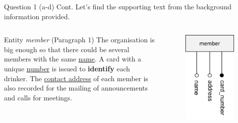 \begin{frame}[fragile]{Question 1 (a-d) Cont.}
Let's find the supporting text from the background information provided.\\ \vspace{5pt}

\begin{columns}[t]
	\begin{exampleblock}{Entity \textit{member} (Paragraph 1)}
		The organisation is big enough so that there could be several
		members with the same \underline{name}. A card with a unique \underline{number} is issued to \textbf{identify} each drinker. The \underline{contact address} of each member is also recorded for the mailing of announcements and calls for meetings.
	\end{exampleblock}
	\begin{figure}
		\includegraphics[width=1\textwidth]{t4/images/member_entity.png}
	\end{figure}
\end{columns}
\end{frame}

